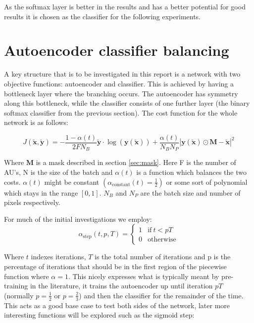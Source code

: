     As the softmax layer is better in the results and has a better potential for good results
    it is chosen as the classifier for the following experiments.

  \section{Autoencoder classifier balancing} \label{sec:autoalpha}
    A key structure that is to be investigated in this report is a network with two objective functions:
    autoencoder and classifier. This is achieved by having a bottleneck layer where the branching occurs.
    The autoencoder has symmetry along this bottleneck, while the classifier consists of one further layer
    (the binary softmax classifier from the previous section). The cost function for the whole network is as follows:

    \begin{equation}
        J(\tilde{\mathbf{x}},\tilde{\mathbf{y}}) = -\frac{1-\alpha(t)}{2FN_B}\tilde{\mathbf{y}}\cdot\log(\mathbf{y}(\tilde{\mathbf{x}}))
        + \frac{\alpha(t)}{N_BN_P}\left |\mathbf{y}(\tilde{\mathbf{x}}) \odot \mathbf{M}-\tilde{\mathbf{x}}\right | ^2
    \end{equation}

    Where $\mathbf{M}$ is a mask described in section \ref{sec:mask}. Here F is the number of AU's, N is the size of the batch and $\alpha(t)$ is a
    function which balances the two costs. $\alpha(t)$ might be constant $\left ( \alpha_{\text{constant}}(t)=\frac{1}{2} \right )$ or
    some sort of polynomial which stays in the range $[0,1]$. $N_B$ and $N_P$ are the batch size and number of pixels respectively.

    For much of the initial investigations we employ:
    \begin{equation}
    \alpha_{\text{step}}(t,p,T) =
    \begin{cases}
      1           & \text{if}\ t<pT \\
      0           & \text{otherwise}
    \end{cases}
    \end{equation}

    Where $t$ indexes iterations, $T$ is the total number of iterations and p is the
    percentage of iterations that should be in the first region of the piecewise function
    where $\alpha=1$.
    This nicely expresses what is typically meant by pre-training in the literature, it trains
    the autoencoder up until iteration $pT$ (normally $p=\frac{1}{2}$ or $p=\frac{2}{3}$) and then the classifier for the remainder of the time.
    This acts as a good base case to test both sides of the network, later more interesting
    functions will be explored such as the sigmoid step:

